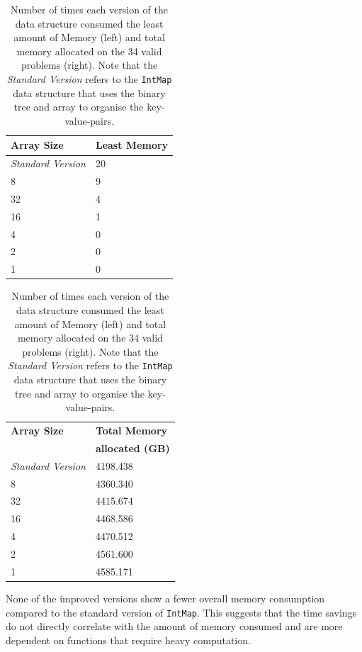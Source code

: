 \documentclass[]{ceurart}
\begin{document}
\begin{table}[h!]
  \centering
    \begin{minipage}{0.45\textwidth}
        \centering
        \begin{tabular}{l|l}
            \textbf{Array Size} & \textbf{Least Memory} \\ \hline
            \textit{Standard Version} & 20 \\ \hline
            8 & 9 \\ \hline
            32 & 4 \\ \hline
            16 & 1 \\ \hline
            4 & 0 \\ \hline
            2 & 0 \\ \hline
            1 & 0 \\
        \end{tabular}
    \end{minipage}
    \begin{minipage}{0.45\textwidth}
        \centering
        \begin{tabular}{l|l}
            \textbf{Array Size} & \textbf{Total Memory} \\
                                & \textbf{allocated (GB)} \\ \hline
            \textit{Standard Version} & 4198.438 \\ \hline
            8 & 4360.340 \\ \hline
            32 & 4415.674 \\ \hline
            16 & 4468.586 \\ \hline
            4 & 4470.512 \\ \hline
            2 & 4561.600 \\ \hline
            1 & 4585.171 \\
        \end{tabular}
    \end{minipage}
  \caption{
    Number of times each version of the data structure consumed the
    least amount of Memory (left) and total memory allocated on the
    34 valid problems (right). Note that the
    \textit{Standard Version} refers to the \texttt{IntMap} data
    structure that uses the binary tree and array to organise the
    key-value-pairs.
    }
  \label{fig:results_memory}
\end{table}

None of the improved versions show a fewer overall memory consumption
compared to the standard version of \texttt{IntMap}. This suggests that the
time savings do not directly correlate with the amount of memory
consumed and are more dependent on functions that require heavy computation.
\end{document}
